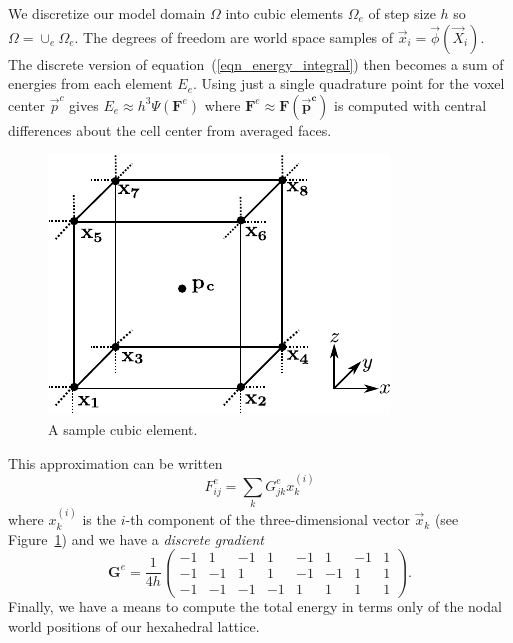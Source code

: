 
We discretize our model domain $\Omega$ into cubic elements $\Omega_e$ of step size $h$ so $\Omega=\cup_e\Omega_e$. The degrees of freedom are world space samples of
$\vec{x}_i=\vec{\phi}(\vec{X}_i)$. The discrete version of
equation~(\ref{eqn_energy_integral}) then becomes a sum of energies from each element $E_e$.  Using just a single quadrature point for the voxel center $\vec{p}^c$ gives $E_e \approx h^3\Psi(\mathbf{F}^e)$ where $\mathbf{F}^e\approx\mathbf{F(\vec{p}^c)}$ is computed with central differences about the cell center from averaged faces.
\begin{figure}
\centering
\includegraphics[width=.35\columnwidth]{elasticity/figures/grid.pdf}
\caption{A sample cubic element.}\label{fig:cubic_element}
\end{figure}
 This approximation can be written
\begin{equation}
F_{ij}^e=\sum_kG_{jk}^ex_k^{(i)}
\label{eqn_discrete_gradient}
\end{equation}
where $x_k^{(i)}$ is the $i$-th component of the three-dimensional vector $\vec{x}_k$ (see Figure~\ref{fig:cubic_element}) and we have
a \emph{discrete gradient}
{\small$$
\mathbf{G}^e=
\frac{1}{4h}
\left(
\begin{array}{cccccccc}
-1 &  1 & -1 &  1 & -1 &  1 & -1 &  1 \\
-1 & -1 &  1 &  1 & -1 & -1 &  1 &  1 \\
-1 & -1 & -1 & -1 &  1 &  1 &  1 &  1
\end{array}
\right).
$$}
Finally, we have a means to compute the total energy in terms only of the nodal world positions of our hexahedral lattice.



